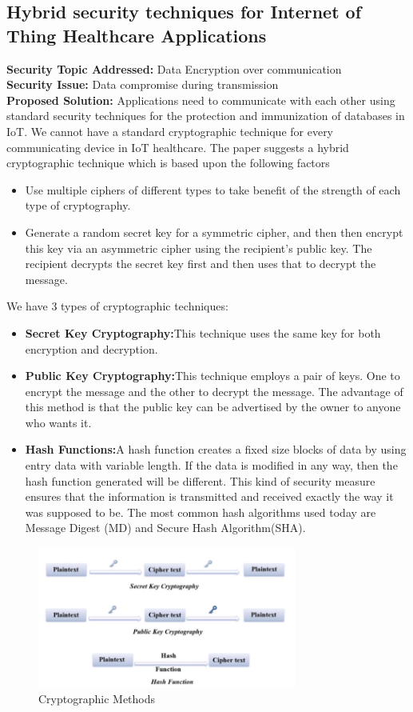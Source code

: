 \documentclass[letterpaper, 10 pt, conference]{ieeeconf}  %
\begin{document}
\subsection{\textbf{Hybrid security techniques for Internet of Thing Healthcare Applications}\cite{three}}
\noindent \textbf{Security Topic Addressed:} Data Encryption over communication\\
\textbf{Security Issue:} Data compromise during transmission\\
\textbf{Proposed Solution:} 
Applications need to communicate with each other using standard security techniques for the protection and immunization of databases in IoT. We cannot have a standard cryptographic technique for every communicating device in IoT healthcare. The paper suggests a hybrid cryptographic technique which is based upon the following factors
\begin{itemize}
\item Use multiple ciphers of different types to take benefit of the strength of each type of cryptography.
\item Generate a random secret key for a symmetric cipher, and then then encrypt this key via an asymmetric cipher using the recipient's public key. The recipient decrypts the secret key first and then uses that to decrypt the message.
\end{itemize}
We have 3 types of cryptographic techniques:
\begin{itemize}
\item \textbf{Secret Key Cryptography:}This technique uses the same key for both encryption and decryption.
\item \textbf{Public Key Cryptography:}This technique employs a pair of keys. One to encrypt the message and the other to decrypt the message. The advantage of this method is that the public key can be advertised by the owner to anyone who wants it.
\item \textbf{Hash Functions:}A hash function creates a fixed size blocks of data by using entry data with variable length. If the data is modified in any way, then the hash function generated will be different. This kind of security measure ensures that the information is transmitted and received exactly the way it was supposed to be. The most common hash algorithms used today are Message Digest (MD) and Secure Hash Algorithm(SHA).
\end{itemize}
\begin{figure}[!ht]
\centering
\includegraphics[width= 8.5cm]{fig1.png}
\caption{Cryptographic Methods}
\end{figure}
\end{document}
